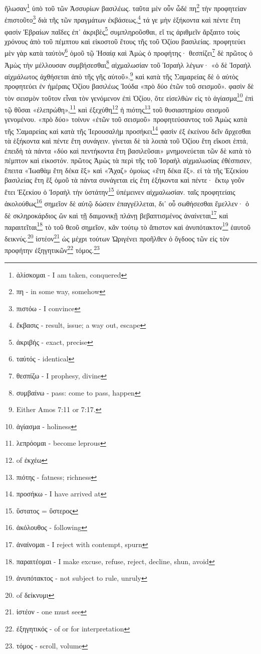 ἥλωσαν\footnote{ἁλίσκομαι - I am taken, conquered}
ὑπὸ
τοῦ
τῶν
Ἀσσυρίων
βασιλέως. 
ταῦτα
μὲν
οὖν
ὧδέ
πη\footnote{πη - in some way, somehow}
τὴν
προφητείαν
ἐπιστοῦτο\footnote{πιστόω - I convince}
διὰ
τῆς
τῶν
πραγμάτων
ἐκβάσεως,\footnote{ἔκβασις - result, issue; a way out, escape}
τά
γε
μὴν
ἑξήκοντα
καὶ
πέντε
ἔτη
φασὶν
Ἑβραίων
παῖδες
ἐπ᾽ 
ἀκριβὲς\footnote{ἀκριβής - exact, precise}
συμπληροῦσθαι, 
εἴ
τις
ἀριθμεῖν
ἄρξαιτο
τοὺς
χρόνους
ἀπὸ
τοῦ
πέμπτου
καὶ
εἰκοστοῦ
ἔτους
τῆς
τοῦ
Ὀζίου
βασιλείας. 
προφητεύει
μὲν
γὰρ
κατὰ
ταὐτὸν\footnote{ταὐτός - identical}
ὁμοῦ
τῷ
Ἠσαίᾳ
καὶ
Ἀμὼς
ὁ
προφήτης·
θεσπίζει\footnote{θεσπίζω - I prophesy, divine}
δὲ
πρῶτος
ὁ
Ἀμὼς
τὴν
μέλλουσαν
συμβήσεσθαι\footnote{συμβαίνω - pass: come to pass, happen}
αἰχμαλωσίαν
τοῦ
Ἰσραὴλ
λέγων·
«ὁ
δὲ
Ἰσραὴλ
αἰχμάλωτος
ἀχθήσεται
ἀπὸ
τῆς
γῆς
αὐτοῦ».\footnote{Either Amos 7:11 or 7:17.} 
καὶ
κατὰ
τῆς
Σαμαρείας
δὲ
ὁ
αὐτὸς
προφητεύει
ἐν
ἡμέραις
Ὀζίου
βασιλέως
Ἰούδα
«πρὸ
δύο
ἐτῶν
τοῦ
σεισμοῦ». 
φασὶν
δὲ
τὸν
σεισμὸν
τοῦτον
εἶναι
τὸν
γενόμενον
ἐπὶ
Ὀζίου, 
ὅτε
εἰσελθὼν
εἰς
τὸ
ἁγίασμα\footnote{ἁγίασμα - holiness}
ἐπὶ
τῷ
θῦσαι
«ἐλεπρώθη»,\footnote{λεπρόομαι - become leprous}
καὶ
ἐξεχύθη\footnote{ of ἐκχέω}
ἡ
πιότης\footnote{πιότης - fatness; richness}
τοῦ
θυσιαστηρίου
σεισμοῦ
γενομένου.
«πρὸ
δύο» 
τοίνυν
«ἐτῶν
τοῦ
σεισμοῦ» 
προφητεύσαντος
τοῦ
Ἀμὼς
κατὰ
τῆς
Σαμαρείας
καὶ
κατὰ
τῆς
Ἰερουσαλὴμ
προσήκει\footnote{προσήκω - I have arrived at}
φασὶν
ἐξ
ἐκείνου
δεῖν
ἄρχεσθαι
τὰ
ἑξήκοντα
καὶ
πέντε
ἔτη
συνάγειν.
γίνεται
δὲ
τὰ
λοιπὰ
τοῦ
Ὀζίου
ἔτη
εἴκοσι
ἑπτά,
ἐπειδὴ
τὰ
πάντα
«δύο
καὶ
πεντήκοντα
ἔτη
βασιλεῦσαι»
μνημονεύεται
τῶν
δὲ
κατὰ
τὸ
πέμπτον
καὶ
εἰκοστόν. 
πρῶτος
Ἀμὼς
τὰ
περὶ
τῆς
τοῦ
Ἰσραὴλ
αἰχμαλωσίας
ἐθέσπισεν, 
ἔπειτα
«Ἰωαθὰμ
ἔτη
δέκα
ἓξ» 
καὶ
«Ἄχαζ» 
ὁμοίως
«ἔτη
δέκα
ἕξ». 
εἰ
τὰ
τῆς
Ἑζεκίου
βασιλείας
ἔτη
ἓξ
ὁμοῦ
τὰ
πάντα
συνάγεται
εἰς
ἔτη
ἑξήκοντα
καὶ
πέντε·
ἕκτῳ
γοῦν
ἔτει
Ἑζεκίου
ὁ
Ἰσραὴλ
τὴν
ὑστάτην\footnote{ὕστατος = ὕστερος}
ὑπέμεινεν
αἰχμαλωσίαν. 
ταῖς
προφητείαις
ἀκολούθως\footnote{ἀκόλουθος - following}
σημεῖον
δὲ
αὐτῷ
δώσειν
ἐπαγγέλλεται, 
δι᾽
οὗ
σωθήσεσθαι
ἔμελλεν·
ὁ
δὲ
σκληροκάρδιος
ὢν
καὶ
τῇ
δαιμονικῇ
πλάνῃ
βεβαπτισμένος
ἀναίνεται\footnote{ἀναίνομαι - I reject with contempt, spurn}
καὶ
παραιτεῖται\footnote{παραιτέομαι - I make excuse, refuse, reject, decline, shun, avoid}
τὸ
τοῦ
θεοῦ
σημεῖον, 
κἂν
τούτῳ
τὸ
ἄπιστον
καὶ
ἀνυπότακτον\footnote{ἀνυπότακτος - not subject to rule, unruly}
ἑαυτοῦ
δεικνύς.\footnote{ of δείκνυμι}
ἰστέον\footnote{ἰστέον - one must see}
ὡς
μέχρι
τούτων
Ὠριγένει
προῆλθεν
ὁ
ὄγδοος
τῶν
εἰς
τὸν
προφήτην
ἐξηγητικῶν\footnote{ἐξηγητικός - of or for interpretation}
τόμος.\footnote{τόμος - scroll, volume}


